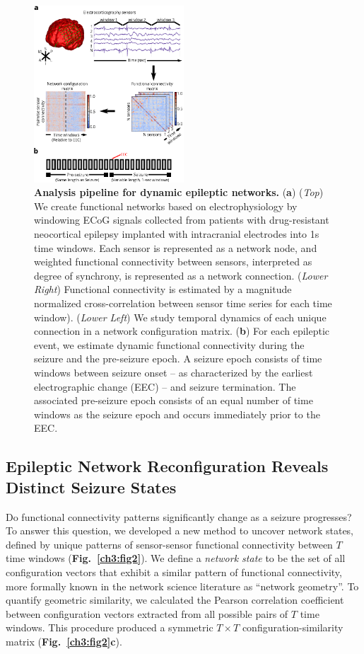 \newpage
\begin{figure}[H]
    \centering
    \includegraphics[width=0.5\textwidth]{panel1.eps}
\caption[Pipeline for measuring time-Varying functional networks]{\textbf{Analysis pipeline for dynamic epileptic networks.} (\textbf{a}) (\textit{Top}) We create functional networks based on electrophysiology by windowing ECoG signals collected from patients with drug-resistant neocortical epilepsy implanted with intracranial electrodes into 1s time windows. Each sensor is represented as a network node, and weighted functional connectivity between sensors, interpreted as degree of synchrony, is represented as a network connection. (\textit{Lower Right}) Functional connectivity is estimated by a magnitude normalized cross-correlation between sensor time series for each time window). (\textit{Lower Left}) We study temporal dynamics of each unique connection in a network configuration matrix. (\textbf{b}) For each epileptic event, we estimate dynamic functional connectivity during the seizure and the pre-seizure epoch. A seizure epoch consists of time windows between seizure onset -- as characterized by the earliest electrographic change (EEC) \cite{litt2001epileptic} -- and seizure termination. The associated pre-seizure epoch consists of an equal number of time windows as the seizure epoch and occurs immediately prior to the EEC. \label{ch3:fig1}}
\end{figure}


\subsection{Epileptic Network Reconfiguration Reveals Distinct Seizure States}
Do functional connectivity patterns significantly change as a seizure progresses? To answer this question, we developed a new method to uncover network states, defined by unique patterns of sensor-sensor functional connectivity between $T$ time windows (\textbf{Fig.~\ref{ch3:fig2}}). We define a \emph{network state} to be the set of all configuration vectors that exhibit a similar pattern of functional connectivity, more formally known in the network science literature as ``network geometry''. To quantify geometric similarity, we calculated the Pearson correlation coefficient between configuration vectors extracted from all possible pairs of $T$ time windows. This procedure produced a symmetric $T \times T$ configuration-similarity matrix (\textbf{Fig.~\ref{ch3:fig2}c}). 

